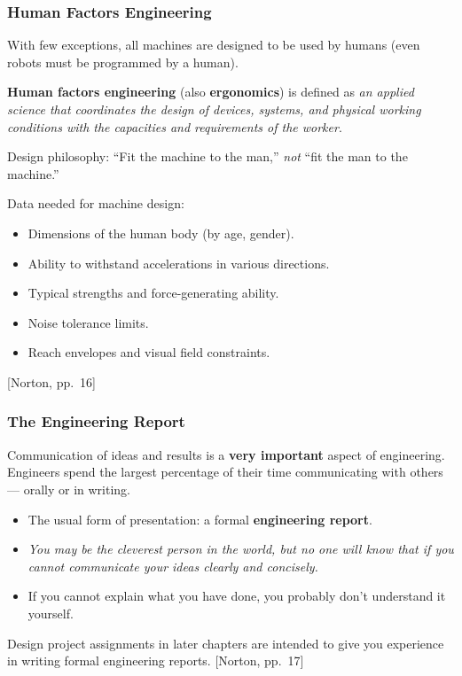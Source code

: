 \documentclass[10pt,aspectratio=43]{beamer}
\newcommand{\pref}[1]{\vfill\hfill{\scriptsize\color{gray}[Norton, pp.~#1]}}
\begin{document}
\begin{frame}
\frametitle{Human Factors Engineering}

With few exceptions, all machines are designed to be used by humans (even robots must be programmed by a human).

\begin{yellowbox}
\textbf{Human factors engineering} (also \textbf{ergonomics}) is defined as \emph{an applied science that coordinates the design of devices, systems, and physical working conditions with the capacities and requirements of the worker}.
\end{yellowbox}

\vspace{6pt}
Design philosophy: ``Fit the machine to the man,'' \emph{not} ``fit the man to the machine.''

\vspace{6pt}
Data needed for machine design:
\begin{itemize}
  \item Dimensions of the human body (by age, gender).
  \item Ability to withstand accelerations in various directions.
  \item Typical strengths and force-generating ability.
  \item Noise tolerance limits.
  \item Reach envelopes and visual field constraints.
\end{itemize}
\pref{16}
\end{frame}


\begin{frame}
\frametitle{The Engineering Report}

\begin{redbox}
Communication of ideas and results is a \textbf{very important} aspect of engineering. Engineers spend the largest percentage of their time communicating with others --- orally or in writing.
\end{redbox}

\vspace{6pt}
\begin{itemize}
  \item The usual form of presentation: a formal \textbf{engineering report}.
  \item \emph{You may be the cleverest person in the world, but no one will know that if you cannot communicate your ideas clearly and concisely.}
  \item If you cannot explain what you have done, you probably don't understand it yourself.
\end{itemize}

\vspace{6pt}
Design project assignments in later chapters are intended to give you experience in writing formal engineering reports.
\pref{17}
\end{frame}
\end{document}
